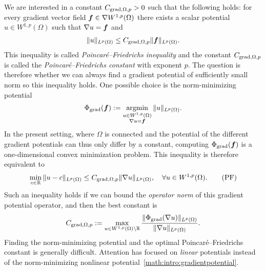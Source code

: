 \documentclass[10pt,a4paper]{article}
\begin{document}
We are interested in a constant $C_{\operatorname{grad},\Omega,p} > 0$ such that the following holds:
for every gradient vector field $\bm{f} \in \nabla W^{1,p}(\Omega)$ 
there exists a scalar potential $u \in W^{1,p}(\Omega)$
such that $\nabla u = \bm{f}$ and 
\begin{align}\label{math:intro:inequalitypf:gradient} 
    \| u \|_{L^{p}(\Omega)}
    \leq 
    C_{\operatorname{grad},\Omega,p} 
    \| \bm{f} \|_{L^{p}(\Omega)}
    .
\end{align}
This inequality is called \emph{Poincar\'e--Friedrichs inequality} and the constant $C_{\operatorname{grad},\Omega,p}$ is called the \emph{Poincar\'e--Friedrichs constant} with exponent $p$. 
The question is therefore whether we can always find a gradient potential of sufficiently small norm so this inequality holds. 
One possible choice is the norm-minimizing potential 
\begin{align}\label{math:intro:gradientpotential}
    \Phi_{\operatorname{grad}}( \bm{f} ) := \operatorname*{{\rm argmin}}\limits_{ \substack{ u \in W^{1,p}(\Omega) \\ \nabla u = \bm{f} } } \| u \|_{L^{p}(\Omega)}.
\end{align}
In the present setting, where $\Omega$ is connected and the potential of the different gradient potentials can thus only differ by a constant, computing $\Phi_{\operatorname{grad}}( \bm{f} )$ is a one-dimensional convex minimization problem. 
This inequality is therefore equivalent to  
\begin{align}\label{math:intro:poincarefriedrichs:grad}
    \min\limits_{c\in{\mathbb R}}
    \| u - c \|_{L^{p}(\Omega)}
    \leq 
    C_{\operatorname{grad},\Omega,p} \| \nabla u \|_{L^{p}(\Omega)},
    \quad 
    \forall
    u \in W^{1,p}(\Omega) 
    .\tag{PF} 
\end{align}
Such an inequality holds if we can bound the \emph{operator norm} of this gradient potential operator, and then the best constant is  
\begin{align}\label{math:intro:gradient:potentialnorm}
    C_{\operatorname{grad},\Omega,p} := \max\limits_{ u \in W^{1,p}(\Omega) \setminus {\mathbb R} } 
    \frac{ \| \Phi_{\operatorname{grad}}(\nabla u) \|_{L^{p}(\Omega)} }{ \| \nabla u \|_{L^{p}(\Omega)} }.
\end{align}
Finding the norm-minimizing potential and the optimal Poincar\'e--Friedrichs constant is generally difficult. 
Attention has focused on \emph{linear} potentials instead of the norm-minimizing nonlinear potential~\eqref{math:intro:gradientpotential}.
\end{document}

